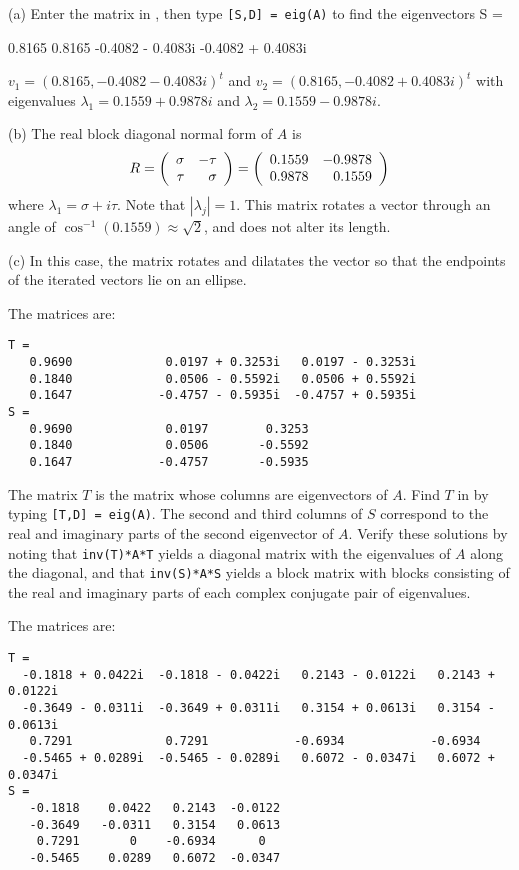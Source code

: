 (a) Enter the matrix in \Matlabp, then type {\tt [S,D] = eig(A)} to
find the eigenvectors 
S =
 
   0.8165             0.8165
  -0.4082 - 0.4083i  -0.4082 + 0.4083i

$v_1 = (0.8165, -0.4082 - 0.4083i)^t$ and
$v_2 = (0.8165, -0.4082 + 0.4083i)^t$ with eigenvalues
$\lambda_1 = 0.1559 + 0.9878i$ and $\lambda_2 = 0.1559 - 0.9878i$.

(b) The real block diagonal normal form of $A$ is
\[
R = \left(\begin{array}{rr} \sigma & -\tau\\ \tau &\sigma\end{array}\right) = \left(\begin{array}{rr} 0.1559 & -0.9878\\ 0.9878 &0.1559\end{array}\right)
\]
where $\lambda_1 = \sigma + i\tau$.  Note that $|\lambda_j|=1$.  
This matrix rotates a vector through an angle of 
$\cos^{-1}(0.1559) \approx \sqrt{2}$, and does not alter its length.  

\newpage
(c) In this case, the matrix rotates and dilatates the vector so that
the endpoints of the iterated vectors lie on an ellipse.

\ans The matrices are:
\begin{verbatim}
T =
   0.9690             0.0197 + 0.3253i   0.0197 - 0.3253i
   0.1840             0.0506 - 0.5592i   0.0506 + 0.5592i
   0.1647            -0.4757 - 0.5935i  -0.4757 + 0.5935i
S =
   0.9690             0.0197        0.3253   
   0.1840             0.0506       -0.5592 
   0.1647            -0.4757       -0.5935 
\end{verbatim}

\soln The matrix $T$ is the matrix whose columns are eigenvectors of $A$. 
Find $T$ in \Matlab by typing {\tt [T,D] = eig(A)}.  The second and third columns
of $S$ correspond to the real and imaginary parts of the second eigenvector
of $A$.  Verify these solutions by noting that
{\tt inv(T)*A*T} yields a diagonal matrix with the eigenvalues of $A$
along the diagonal, and that {\tt inv(S)*A*S} yields a block matrix
with blocks consisting of the real and imaginary parts of each complex
conjugate pair of eigenvalues.

\ans The matrices are:
\begin{verbatim}
T =
  -0.1818 + 0.0422i  -0.1818 - 0.0422i   0.2143 - 0.0122i   0.2143 + 0.0122i
  -0.3649 - 0.0311i  -0.3649 + 0.0311i   0.3154 + 0.0613i   0.3154 - 0.0613i
   0.7291             0.7291            -0.6934            -0.6934
  -0.5465 + 0.0289i  -0.5465 - 0.0289i   0.6072 - 0.0347i   0.6072 + 0.0347i
S =
   -0.1818    0.0422   0.2143  -0.0122
   -0.3649   -0.0311   0.3154   0.0613
    0.7291       0    -0.6934      0
   -0.5465    0.0289   0.6072  -0.0347
\end{verbatim}

